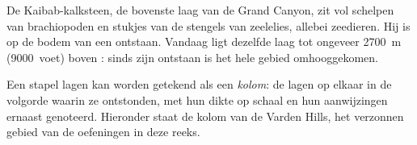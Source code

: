 \begin{example}\label{ex:g7:sediments-and-fossils:kaibab}
De Kaibab-kalksteen, de bovenste laag van de Grand Canyon, zit vol schelpen
van brachiopoden en stukjes van de stengels van zeelelies, allebei
zeedieren. Hij is op de bodem van een  ontstaan. Vandaag ligt dezelfde
laag tot ongeveer \qty{2700}{m} (\num{9000}~voet) boven : sinds
zijn ontstaan is het hele gebied omhooggekomen.
\end{example}

Een stapel lagen kan worden getekend als een \emph{kolom}: de lagen op
elkaar in de volgorde waarin ze ontstonden, met hun dikte op schaal en hun
aanwijzingen ernaast genoteerd. Hieronder staat de kolom van de Varden
Hills, het verzonnen gebied van de oefeningen in deze reeks.

